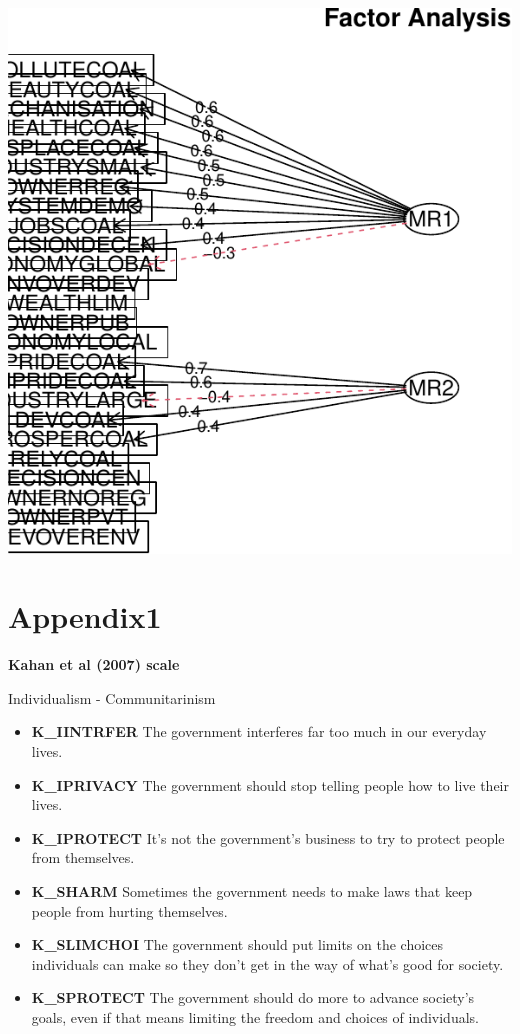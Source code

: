 \documentclass[
]{article}
\providecommand{\tightlist}{%
  \setlength{\itemsep}{0pt}\setlength{\parskip}{0pt}}
\begin{document}
\includegraphics{module2PCAs_files/figure-latex/unnamed-chunk-12-1.pdf}

\newpage

\hypertarget{appendix1}{%
\section{Appendix1}\label{appendix1}}

\textbf{Kahan et al (2007) scale}

Individualism - Communitarinism

\begin{itemize}
\tightlist
\item
  \textbf{K\_IINTRFER} The government interferes far too much in our
  everyday lives.
\item
  \textbf{K\_IPRIVACY} The government should stop telling people how to
  live their lives.
\item
  \textbf{K\_IPROTECT} It's not the government's business to try to
  protect people from themselves.
\item
  \textbf{K\_SHARM} Sometimes the government needs to make laws that
  keep people from hurting themselves.
\item
  \textbf{K\_SLIMCHOI} The government should put limits on the choices
  individuals can make so they don't get in the way of what's good for
  society.
\item
  \textbf{K\_SPROTECT} The government should do more to advance
  society's goals, even if that means limiting the freedom and choices
  of individuals.
\end{itemize}
\end{document}
